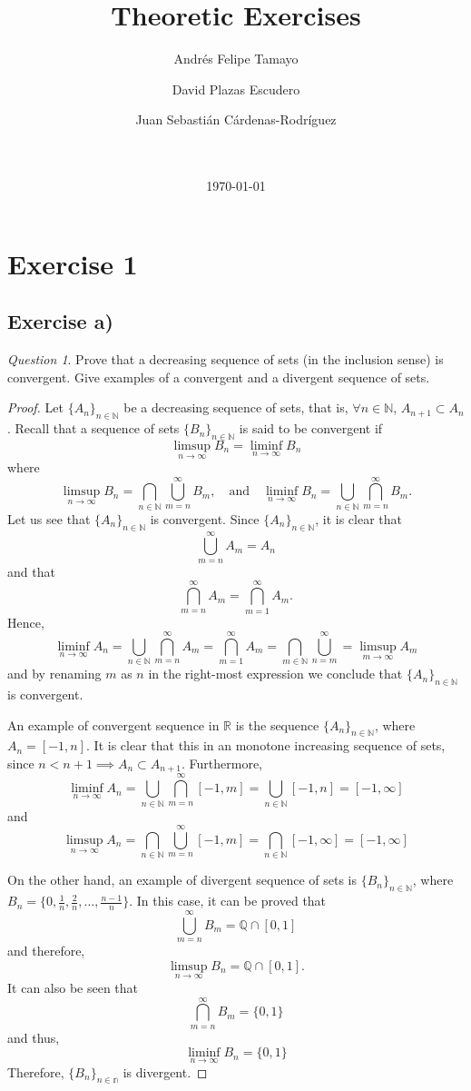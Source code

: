 \documentclass[11pt]{article}
\title{Theoretic Exercises}
\author{Andrés Felipe Tamayo \\
  \scalebox{0.7}{aftamayoa@eafit.edu.co} \and
  David Plazas Escudero \\
  \scalebox{0.7}{dplazas@eafit.edu.co} \and
  Juan Sebasti\'an C\'ardenas-Rodríguez \\
  \scalebox{0.7}{jscardenar@eafit.edu.co} \\ \\
  \scalebox{0.7}{Mathematical Engineering, Universidad EAFIT}}
\date{\today}
\theoremstyle{definition}
\theoremstyle{remark}
\theoremstyle{remark}
\theoremstyle{remark}
\newtheorem*{question}{Question}
\begin{document}
\maketitle

\section*{Exercise 1}

\subsection*{Exercise a)}

\begin{question}
  Prove that a decreasing sequence of sets (in the inclusion sense) is
  convergent. Give examples of a convergent and a divergent sequence of sets.
\end{question}

\begin{proof}
  Let $\{A_n\}_{n\in\mathbb{N}}$ be a decreasing sequence of sets, that is,
  $\forall n\in\mathbb{N}$, $A_{n+1}\subset A_n$. Recall that a sequence of sets
  $\{B_n\}_{n\in\mathbb{N}}$ is said to be convergent if
  \[
    \limsup_{n\rightarrow\infty}{B_n} = \liminf_{n\rightarrow\infty}{B_n}
  \]
  where
  \[
    \limsup_{n\rightarrow\infty}{B_n} = \bigcap_{n\in\mathbb{N}}\bigcup_{m=n}^\infty B_m,\quad\text{and}\quad\liminf_{n\rightarrow\infty}{B_n} = \bigcup_{n\in\mathbb{N}}\bigcap_{m=n}^\infty B_m.
  \]
  Let us see that $\{A_n\}_{n\in\mathbb{N}}$ is convergent. Since
  $\{A_n\}_{n\in\mathbb{N}}$, it is clear that
  \[
    \bigcup_{m=n}^\infty A_m = A_n
  \]
  and that
  \[
    \bigcap_{m=n}^\infty A_m=\bigcap_{m=1}^\infty A_m.
  \]
  Hence,
  \[
    \liminf_{n\rightarrow\infty}{A_n}=\bigcup_{n\in\mathbb{N}}\bigcap_{m=n}^\infty A_m = \bigcap_{m=1}^\infty A_m = \bigcap_{m\in\mathbb{N}}\bigcup_{n=m}^\infty=\limsup_{m\rightarrow\infty}{A_m}
  \]
  and by renaming $m$ as $n$ in the right-most expression we conclude that
  $\{A_n\}_{n\in\mathbb{N}}$ is convergent.

  An example of convergent sequence in $\mathbb{R}$ is the sequence
  $\{A_n\}_{n\in\mathbb{N}}$, where $A_n=[-1, n]$. It is clear that this in an
  monotone increasing sequence of sets, since
  $n<n+1\implies A_n\subset A_{n+1}$. Furthermore,
  \[
    \liminf_{n\rightarrow\infty}{A_n}=\bigcup_{n\in\mathbb{N}}\bigcap_{m=n}^\infty [-1, m]=\bigcup_{n\in\mathbb{N}}[-1, n]=[-1, \infty]
  \]
  and
  \[
    \limsup_{n\rightarrow\infty}{A_n} = \bigcap_{n\in\mathbb{N}}\bigcup_{m=n}^\infty [-1, m]=\bigcap_{n\in\mathbb{N}}[-1,\infty]=[-1,\infty]
  \]

  On the other hand, an example of divergent sequence of sets is
  $\{B_n\}_{n\in\mathbb{N}}$, where
  $B_n=\{0, \frac{1}{n}, \frac{2}{n},\hdots, \frac{n-1}{n}\}$. In this case, it
  can be proved that
  \[
    \bigcup_{m=n}^\infty B_m = \mathbb{Q}\cap[0,1]
  \]
  and therefore,
  \[
    \limsup_{n\rightarrow\infty}{B_n} = \mathbb{Q}\cap[0,1].
  \]
  It can also be seen that
  \[
    \bigcap_{m=n}^\infty B_m = \{0,1\}
  \]
  and thus,
  \[
    \liminf_{n\rightarrow\infty}{B_n} = \{0,1\}
  \]
  Therefore, $\{B_n\}_{n\in\mathbb{n}}$ is divergent.
  \end{proof}
\end{document}
